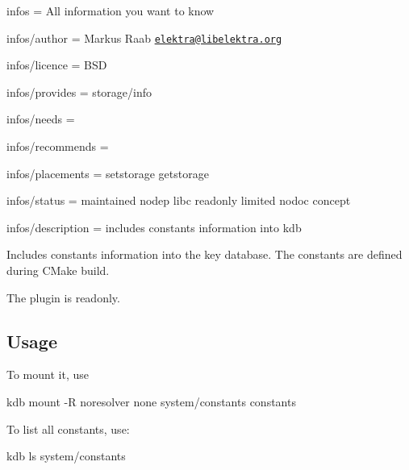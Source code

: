 
\begin{DoxyItemize}
\item infos = All information you want to know
\item infos/author = Markus Raab \href{mailto:elektra@libelektra.org}{\tt elektra@libelektra.\+org}
\item infos/licence = B\+SD
\item infos/provides = storage/info
\item infos/needs =
\item infos/recommends =
\item infos/placements = setstorage getstorage
\item infos/status = maintained nodep libc readonly limited nodoc concept
\item infos/description = includes constants information into kdb
\end{DoxyItemize}

Includes constants information into the key database. The constants are defined during C\+Make build.

The plugin is readonly.

\subsection*{Usage}

To mount it, use \begin{DoxyVerb}kdb mount -R noresolver none system/constants constants
\end{DoxyVerb}


To list all constants, use\+: \begin{DoxyVerb}kdb ls system/constants\end{DoxyVerb}
 